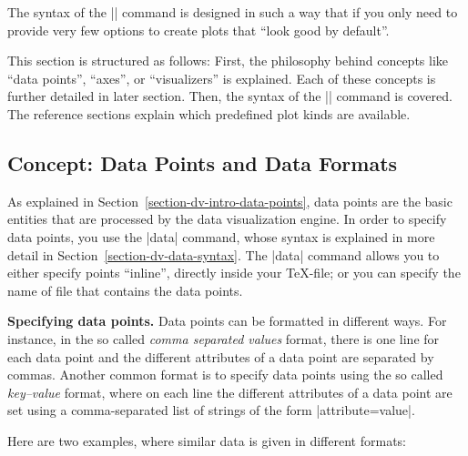 The syntax of the |\datavisualization| command is designed in such a way that
if you only need to provide very few options to create plots that ``look good
by default''.

This section is structured as follows: First, the philosophy behind concepts
like ``data points'', ``axes'', or ``visualizers'' is explained. Each of these
concepts is further detailed in later section. Then, the syntax of the
|\datavisualization| command is covered. The reference sections explain which
predefined plot kinds are available.


\subsection{Concept: Data Points and Data Formats}

As explained in Section~\ref{section-dv-intro-data-points}, data points are the
basic entities that are processed by the data visualization engine. In order to
specify data points, you use the |data| command, whose syntax is explained in
more detail in Section~\ref{section-dv-data-syntax}. The |data| command allows
you to either specify points ``inline'', directly inside your \TeX-file; or you
can specify the name of file that contains the data points.

\medskip
\textbf{Specifying data points.}
Data points can be formatted in different ways. For instance, in the so called
\emph{comma separated values} format, there is one line for each data point and
the different attributes of a data point are separated by commas. Another
common format is to specify data points using the so called \emph{key--value}
format, where on each line the different attributes of a data point are set
using a comma-separated list of strings of the form |attribute=value|.

Here are two examples, where similar data is given in different formats:
%
\begin{codeexample}[]
\end{codeexample}

\begin{codeexample}[]
\end{codeexample}

